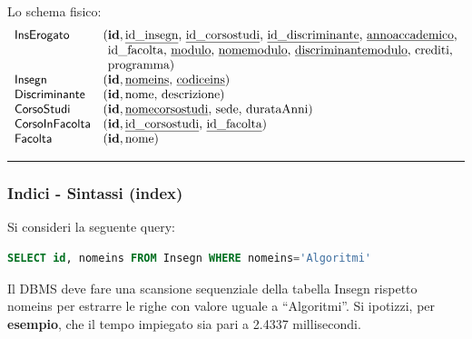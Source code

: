 \documentclass[a4paper]{article}
\newcommand{\longline}{\noindent\rule{\textwidth}{0.4pt}}
\newcommand{\dquotes}[1]{``#1''}
\begin{document}
	\noindent
	Lo schema fisico:
	\begin{equation*}
		\begin{array}{ll}
			\mathsf{InsErogato} 	& (
			\mathsf{\textbf{id}}, \text{\underline{id\_insegn}, \underline{id\_corsostudi}, \underline{id\_discriminante}, \underline{annoaccademico},} \\
			& \phantom{(} \text{id\_facolta, \underline{modulo}, \underline{nomemodulo}, \underline{discriminantemodulo}, crediti,} \\
			& \phantom{(} \text{programma}
			) \\
			\mathsf{Insegn} 		& (\mathsf{\textbf{id}}, \text{\underline{nomeins}, \underline{codiceins}}) \\
			\mathsf{Discriminante} 	& (\mathsf{\textbf{id}}, \text{nome, descrizione}) \\
			\mathsf{CorsoStudi}		& (\mathsf{\textbf{id}}, \text{\underline{nomecorsostudi}, sede, durataAnni}) \\
			\mathsf{CorsoInFacolta}	& (\mathsf{\textbf{id}}, \text{\underline{id\_corsostudi}, \underline{id\_facolta}}) \\
			\mathsf{Facolta}		& (\mathsf{\textbf{id}}, \text{nome})
		\end{array}
	\end{equation*}
	
	\longline
	
	\subsubsection{Indici - Sintassi (\textsf{index})}
	
	Si consideri la seguente query:
	\begin{lstlisting}[language=SQL]
SELECT id, nomeins FROM Insegn WHERE nomeins='Algoritmi'\end{lstlisting}
	Il DBMS deve fare una scansione sequenziale della tabella Insegn rispetto nomeins per estrarre le righe con valore uguale a \dquotes{Algoritmi}. Si ipotizzi, per \textcolor{Green4}{\textbf{esempio}}, che il tempo impiegato sia pari a 2.4337 millisecondi.\newline
	
\end{document}
